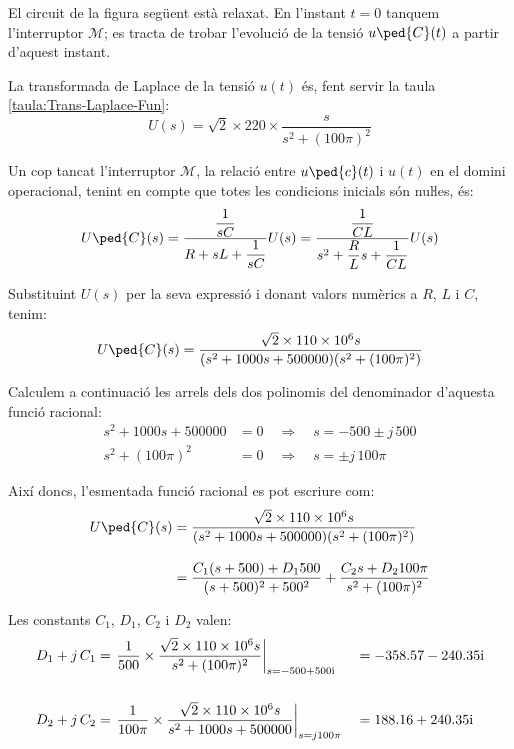 \break	
\begin{exemple}\label{ex:CircuitLaplaceNul}	
	\addcontentsxms{\CircuitLaplaceNul}
    El circuit de la figura següent està relaxat. En l'instant $t=0$
    tanquem l'interruptor $\mathscr{M}$; es tracta de trobar l'evolució de la tensió
    $u\ped{C}(t)$ a partir d'aquest instant.

    \begin{center}
        
    \end{center}

    La transformada de Laplace de la tensió $u(t)$ és, fent servir la taula \ref{taula:Trans-Laplace-Fun}:
    \[
        U(s) = \sqrt{2}\times 220\times \frac{s}{s^2 + (100\pi)^2}
    \]

    Un cop tancat l'interruptor $\mathscr{M}$, la relació entre $u\ped{c}(t)$ i
    $u(t)$ en el domini operacional, tenint en compte que totes les
    condicions inicials són nuŀles, és:
    \[
        U\ped{C}(s) = \frac{\dfrac{1}{sC}}{R+ sL +\dfrac{1}{sC}} U(s)=
        \frac{\dfrac{1}{CL}}{s^2 + \dfrac{R}{L}s +\dfrac{1}{CL}} U(s)
    \]

    Substituint $U(s)$ per la seva expressió i donant valors numèrics a
    $R$, $L$ i $C$, tenim:
    \[
        U\ped{C}(s) = \frac{\sqrt{2}\times 110\times 10^6 s}{(s^2 + 1000 s + 500000)(s^2 + (100\pi)^2)}
    \]

    Calculem a continuació les arrels dels dos polinomis  del
    denominador d'aquesta funció racional:
    \begin{align*}
        s^2 + 1000 s + 500000 &= 0 \quad\Rightarrow\quad s = -500
        \pm j\,500 \\[0.5ex]
        s^2 + (100\pi)^2 &= 0 \quad\Rightarrow\quad s = \pm j\,100\pi
    \end{align*}

    Així doncs, l'esmentada funció racional es pot escriure com:
    \[\begin{split}
    U\ped{C}(s) &= \frac{\sqrt{2}\times 110\times 10^6 s}{(s^2 + 1000 s +
    500000)(s^2 + (100\pi)^2)}   \\[2ex] &= \frac{C_1 (s+500) + D_1
    500}{(s+500)^2+500^2} + \frac{C_2 s + D_2 100 \pi}{s^2 +(100\pi)^2}
    \end{split}\]

    Les constants $C_1$, $D_1$,  $C_2$ i $D_2$ valen:
    \begin{alignat*}{2}
        D_1 + j\,C_1 &= \left.\frac{1}{500}\times \frac{\sqrt{2}\times 110\times 10^6 s}
        {s^2 +(100\pi)^2}\right|_{s=\complexnum{-500+j500}} &&= \complexnum{-358,57 -j 240,35}\\[3.5ex]
        D_2 + j\,C_2 &= \left.\frac{1}{100\pi}\times\frac{\sqrt{2}\times 110\times 10^6 s}
        {s^2 + 1000 s + 500000}\right|_{s=j 100\pi} &&= \complexnum{188,16 + j240,35}
    \end{alignat*}


\end{exemple}
